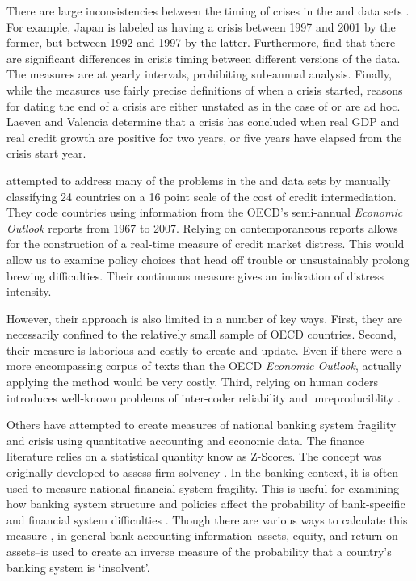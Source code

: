 \documentclass[]{article}
\begin{document}
There are large inconsistencies between the timing of crises in the \cite{laeven2013} and \cite{Reinhart2009} data sets \citep{Chaudron2014}. For example, Japan is labeled as having a crisis between 1997 and 2001 by the former, but between 1992 and 1997 by the latter. Furthermore, \cite{GandrudHallerberg2015} find that there are significant differences in crisis timing between different versions of the \cite{laeven2013} data. The measures are at yearly intervals, prohibiting sub-annual analysis. Finally, while the measures use fairly precise definitions of when a crisis started, reasons for dating the end of a crisis are either unstated as in the case of \cite{Reinhart2009} or are ad hoc. Laeven and Valencia \citeyearpar[footnote 19]{laeven2013} determine that a crisis has concluded when real GDP and real credit growth are positive for two years, or five years have elapsed from the crisis start year.

\cite{Romer2015} attempted to address many of the problems in the \cite{Reinhart2009} and \cite{laeven2013} data sets by manually
classifying 24 countries on a 16 point scale of the cost of
credit intermediation. They code countries using information from the OECD's semi-annual \emph{Economic Outlook} reports from 1967 to 2007. Relying on contemporaneous reports allows for the construction of a real-time measure of credit market distress. This would allow us to examine policy choices that head off trouble or unsustainably prolong brewing difficulties. Their  continuous measure gives an indication of distress intensity.

However, their approach is also limited in a number of key ways. First, they are necessarily confined to the relatively small sample of OECD countries. Second, their measure is laborious and costly to create and update. Even if there were a more encompassing corpus of texts than the OECD \emph{Economic Outlook}, actually applying the method would be very costly. Third, relying on human coders introduces well-known problems of inter-coder reliability and unreproduciblity \citep{Minhas2015}.

Others have attempted to create measures of national banking system fragility and crisis using quantitative accounting and economic data. The finance literature relies on a statistical quantity know as Z-Scores. The concept was originally developed to assess firm solvency \cite{roy1952}. In the banking context, it is often used to measure national financial system fragility. This is useful for examining how banking system structure and policies affect the probability of bank-specific and financial system difficulties \citep[e.g.][]{beck2013bank,vcihak2010islamic,laeven2009bank,uhde2009}. Though there are various ways to calculate this measure \citep[73]{Lepetit2013}, in general bank accounting information--assets, equity, and return on assets--is used to create an inverse measure of the probability that a country's banking system is `insolvent'.
\end{document}
